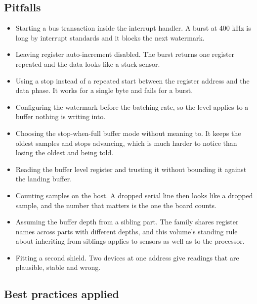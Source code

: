 \subsection*{Pitfalls}

\begin{itemize}
\item Starting a bus transaction inside the interrupt handler. A burst at 400
kHz is long by interrupt standards and it blocks the next watermark.
\item Leaving register auto-increment disabled. The burst returns one register
repeated and the data looks like a stuck sensor.
\item Using a stop instead of a repeated start between the register address and
the data phase. It works for a single byte and fails for a burst.
\item Configuring the watermark before the batching rate, so the level applies
to a buffer nothing is writing into.
\item Choosing the stop-when-full buffer mode without meaning to. It keeps the
oldest samples and stops advancing, which is much harder to notice than losing
the oldest and being told.
\item Reading the buffer level register and trusting it without bounding it
against the landing buffer.
\item Counting samples on the host. A dropped serial line then looks like a
dropped sample, and the number that matters is the one the board counts.
\item Assuming the buffer depth from a sibling part. The family shares register
names across parts with different depths, and this volume's standing rule about
inheriting from siblings applies to sensors as well as to the processor.
\item Fitting a second shield. Two devices at one address give readings that are
plausible, stable and wrong.
\end{itemize}

\subsection*{Best practices applied}

